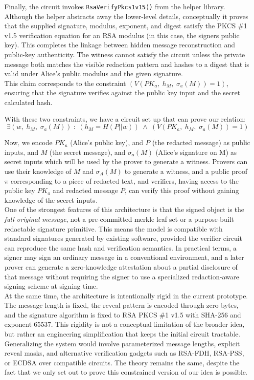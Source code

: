 \documentclass[]{article}
\begin{document}
Finally, the circuit invokes \texttt{RsaVerifyPkcs1v15()} from the helper library. Although the helper abstracts away the lower-level details, conceptually it proves that the supplied signature, modulus, exponent, and digest satisfy the PKCS \#1 v1.5 verification equation for an RSA modulus (in this case, the signers public key). This completes the linkage between hidden message reconstruction and public-key authenticity. The witness cannot satisfy the circuit unless the private message both matches the visible redaction pattern and hashes to a digest that is valid under Alice's public modulus and the given signature.\\

This claim corresponds to the constraint $(V(PK_a, \; h_M,\;  \sigma_a(M))=1)$, ensuring that the signature verifies against the public key input and the secret calculated hash.

With these two constraints, we have a circuit set up that can prove our relation: $$\exists (w, \; h_M, \; \sigma_a(M)) \;:\; (h_M=H(P||w)) \; \land \; (V(PK_a, \; h_M,\;  \sigma_a(M))=1)$$

Now, we encode $PK_a$ (Alice's public key), and $P$ (the redacted message) as public inputs, and $M$ (the secret message), and $\sigma_a(M)$ (Alice's signature on M) as secret inputs which will be used by the prover to generate a witness. Provers can use their knowledge of $M$ and $\sigma_A(M)$ to generate a witness, and a public proof $\pi$ corresponding to a piece of redacted text, and verifiers, having access to the public key $PK_a$ and redacted message $P$, can verify this proof without gaining knowledge of the secret inputs.\\

One of the strongest features of this architecture is that the signed object is the \emph{full original message}, not a pre-committed merkle leaf set or a purpose-built redactable signature primitive. This means the model is compatible with standard signatures generated by existing software, provided the verifier circuit can reproduce the same hash and verification semantics. In practical terms, a signer may sign an ordinary message in a conventional environment, and a later prover can generate a zero-knowledge attestation about a partial disclosure of that message without requiring the signer to use a specialized redaction-aware signing scheme at signing time.\\

At the same time, the architecture is intentionally rigid in the current prototype. The message length is fixed, the reveal pattern is encoded through zero bytes, and the signature algorithm is fixed to RSA PKCS \#1 v1.5 with SHA-256 and exponent 65537. This rigidity is not a conceptual limitation of the broader idea, but rather an engineering simplification that keeps the initial circuit tractable. Generalizing the system would involve parameterized message lengths, explicit reveal masks, and alternative verification gadgets such as RSA-FDH, RSA-PSS, or ECDSA over compatible circuits. The theory remains the same, despite the fact that we only set out to prove this constrained version of our idea is possible.\\
\end{document}
